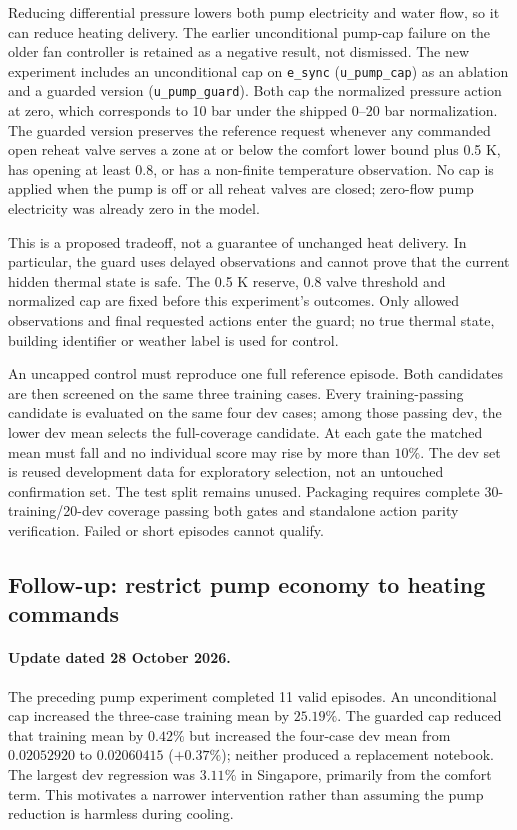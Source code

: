 Reducing differential pressure lowers both pump electricity and water flow,
so it can reduce heating delivery. The earlier unconditional pump-cap failure
on the older fan controller is retained as a negative result, not dismissed.
The new experiment includes an unconditional cap on \texttt{e\_sync}
(\texttt{u\_pump\_cap}) as an ablation and a guarded version
(\texttt{u\_pump\_guard}). Both cap the normalized pressure action at zero,
which corresponds to 10 bar under the shipped 0--20 bar normalization.
The guarded version preserves the reference request whenever any commanded
open reheat valve serves a zone at or below the comfort lower bound plus
0.5 K, has opening at least 0.8, or has a non-finite temperature observation.
No cap is applied when the pump is off or all reheat valves are closed;
zero-flow pump electricity was already zero in the model.

This is a proposed tradeoff, not a guarantee of unchanged heat delivery.
In particular, the guard uses delayed observations and cannot prove that
the current hidden thermal state is safe. The 0.5 K reserve, 0.8 valve threshold
and normalized cap are fixed before this experiment's outcomes. Only allowed
observations and final requested actions enter the guard; no true thermal state,
building identifier or weather label is used for control.

An uncapped control must reproduce one full reference episode. Both candidates
are then screened on the same three training cases. Every training-passing
candidate is evaluated on the same four dev cases; among those passing dev,
the lower dev mean selects the full-coverage candidate. At each gate the matched
mean must fall and no individual score may rise by more than $10\%$.
The dev set is reused development data for exploratory selection, not an
untouched confirmation set. The test split remains unused. Packaging requires
complete 30-training/20-dev coverage passing both gates and standalone action
parity verification. Failed or short episodes cannot qualify.



\subsection{Follow-up: restrict pump economy to heating commands}
\paragraph{Update dated 28 October 2026.}
The preceding pump experiment completed 11 valid episodes. An unconditional
cap increased the three-case training mean by $25.19\%$. The guarded cap
reduced that training mean by $0.42\%$ but increased the four-case dev mean
from $0.02052920$ to $0.02060415$ ($+0.37\%$); neither produced a replacement
notebook. The largest dev regression was $3.11\%$ in Singapore, primarily
from the comfort term. This motivates a narrower intervention rather than
assuming the pump reduction is harmless during cooling.

